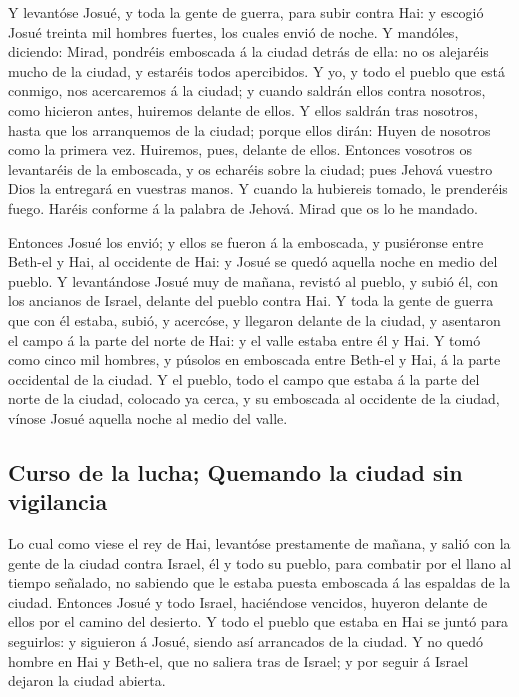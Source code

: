  Y levantóse Josué, y toda la gente de guerra, para subir
contra Hai: y escogió Josué treinta mil hombres fuertes, los cuales
envió de noche.  Y mandóles, diciendo: Mirad, pondréis
emboscada á la ciudad detrás de ella: no os alejaréis mucho de la
ciudad, y estaréis todos apercibidos.  Y yo, y todo el
pueblo que está conmigo, nos acercaremos á la ciudad; y cuando saldrán
ellos contra nosotros, como hicieron antes, huiremos delante de ellos.
 Y ellos saldrán tras nosotros, hasta que los arranquemos de
la ciudad; porque ellos dirán: Huyen de nosotros como la primera vez.
Huiremos, pues, delante de ellos.  Entonces vosotros os
levantaréis de la emboscada, y os echaréis sobre la ciudad; pues Jehová
vuestro Dios la entregará en vuestras manos.  Y cuando la
hubiereis tomado, le prenderéis fuego. Haréis conforme á la palabra de
Jehová. Mirad que os lo he mandado.

 Entonces Josué los envió; y ellos se fueron á la emboscada,
y pusiéronse entre Beth-el y Hai, al occidente de Hai: y Josué se quedó
aquella noche en medio del pueblo.  Y levantándose Josué
muy de mañana, revistó al pueblo, y subió él, con los ancianos de
Israel, delante del pueblo contra Hai.  Y toda la gente de
guerra que con él estaba, subió, y acercóse, y llegaron delante de la
ciudad, y asentaron el campo á la parte del norte de Hai: y el valle
estaba entre él y Hai.  Y tomó como cinco mil hombres, y
púsolos en emboscada entre Beth-el y Hai, á la parte occidental de la
ciudad.  Y el pueblo, todo el campo que estaba á la parte
del norte de la ciudad, colocado ya cerca, y su emboscada al occidente
de la ciudad, vínose Josué aquella noche al medio del valle.

\hypertarget{curso-de-la-lucha-quemando-la-ciudad-sin-vigilancia}{%
\subsection{Curso de la lucha; Quemando la ciudad sin
vigilancia}\label{curso-de-la-lucha-quemando-la-ciudad-sin-vigilancia}}

 Lo cual como viese el rey de Hai, levantóse prestamente de
mañana, y salió con la gente de la ciudad contra Israel, él y todo su
pueblo, para combatir por el llano al tiempo señalado, no sabiendo que
le estaba puesta emboscada á las espaldas de la ciudad. 
Entonces Josué y todo Israel, haciéndose vencidos, huyeron delante de
ellos por el camino del desierto.  Y todo el pueblo que
estaba en Hai se juntó para seguirlos: y siguieron á Josué, siendo así
arrancados de la ciudad.  Y no quedó hombre en Hai y
Beth-el, que no saliera tras de Israel; y por seguir á Israel dejaron la
ciudad abierta.

